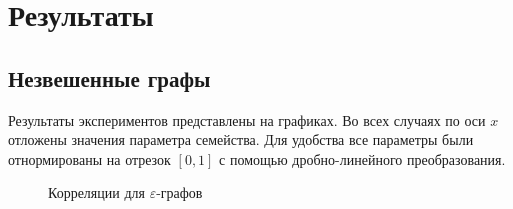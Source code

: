 \chapter{Результаты} \label{chapt3}


\section{Незвешенные графы} \label{sect3_1}

Результаты экспериментов представлены на графиках.
Во всех случаях по оси $x$ отложены значения параметра семейства. Для удобства все параметры были отнормированы на отрезок $[0,1]$ с помощью дробно-линейного преобразования.

\begin{figure}[h]
  \begin{minipage}[h]{0.49\linewidth}
  \end{minipage}
  \hfill
  \begin{minipage}[h]{0.49\linewidth}
  \end{minipage}

  \caption{Корреляции для $\varepsilon$-графов}
  \label{img:eps_graphs}  
\end{figure}

